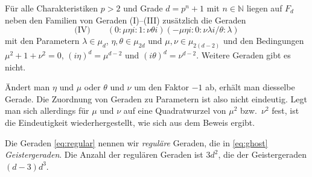 \begin{theorem}[Geistergeraden] \label{th:irreg}
Für alle Charakteristiken $p > 2$ und Grade $d = p^n + 1$ mit $n \in \mathbb N$ liegen auf $F_d$ neben den Familien von Geraden (I)--(III) zusätzlich die Geraden
\begin{equation} \label{eq:ghost}
\text{(IV)}\qquad (0:\mu\eta i:1:\nu\theta i)(-\mu\eta i:0:\nu\lambda i/\theta:\lambda)
\end{equation}
mit den Parametern $\lambda \in \mu_d$, $\eta, \theta \in \mu_{2d}$ und $\mu, \nu \in \mu_{2(d-2)}$ und den Bedingungen $\mu^2 + 1 + \nu^2 = 0$, $(i\eta)^d = \mu^{d-2}$ und $(i\theta)^d = \nu^{d-2}$. Weitere Geraden gibt es nicht.
\end{theorem}
\begin{remarks}
Ändert man $\eta$ und $\mu$ oder $\theta$ und $\nu$ um den Faktor $-1$ ab, erhält man diesselbe Gerade. Die Zuordnung von Geraden zu Parametern ist also nicht eindeutig. Legt man sich allerdings für $\mu$ und $\nu$ auf eine Quadratwurzel von $\mu^2$ bzw.~$\nu^2$ fest, ist die Eindeutigkeit wiederhergestellt, wie sich aus dem Beweis ergibt.
\end{remarks}
Die Geraden \eqref{eq:regular} nennen wir \emph{reguläre} Geraden, die in \eqref{eq:ghost} \emph{Geistergeraden}. Die Anzahl der regulären Geraden ist $3d^2$, die der Geistergeraden $(d-3)d^3$.
